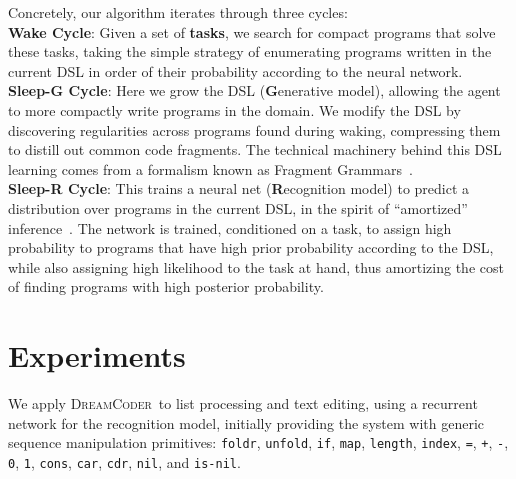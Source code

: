 \documentclass{article}
\newcommand{\system}{\textsc{DreamCoder}~}
\newcommand{\code}[1]{{\footnotesize\texttt{#1}}}
\begin{document}
Concretely, our algorithm iterates through three cycles:
\\\noindent\textbf{Wake Cycle}: Given a set of \textbf{tasks}, 
 we search for compact programs that solve these tasks,
taking the simple strategy of
enumerating programs written in the current DSL in order of their probability according to the neural network.
\\\noindent\textbf{Sleep-G Cycle}: Here we grow  the DSL (\textbf{G}enerative model),
allowing the agent to more compactly
write programs in the domain. We modify the DSL by
discovering regularities across programs found during waking, compressing
them to distill out common code fragments. %
The technical machinery behind this DSL learning
comes from a formalism known as Fragment Grammars~\cite{tim}.
\\\noindent\textbf{Sleep-R Cycle}: This trains a neural net (\textbf{R}ecognition model) to
predict a distribution over programs in the current DSL, in the spirit of ``amortized''  inference~\cite{le2016inference}.
The network is trained, conditioned on a task, to assign high probability to
programs that have high prior probability according to the DSL,
while also assigning high likelihood to the task at hand,
thus amortizing the cost of finding programs with high posterior probability.


\section{Experiments}

We apply \system to list processing %
and text editing, %
using a recurrent network for
the recognition model, initially providing the system with generic sequence manipulation primitives:
\code{foldr}, \code{unfold}, \code{if}, \code{map}, \code{length},
\code{index}, \code{=}, \code{+}, \code{-}, \code{0}, \code{1}, \code{cons},
\code{car}, \code{cdr}, \code{nil}, and \code{is-nil}.
\end{document}
